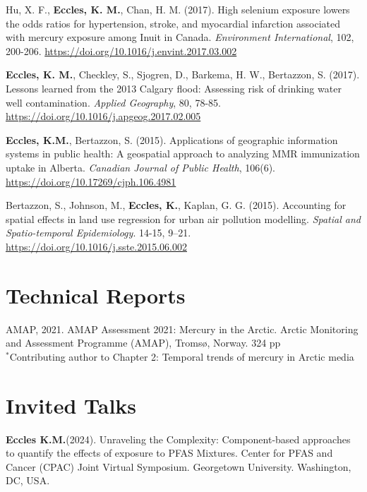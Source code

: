 \documentclass[margin,line]{res}
\begin{document}
\begin{resume}
Hu, X. F., \textbf{Eccles, K. M.}, Chan, H. M. (2017). High selenium exposure lowers the odds ratios for hypertension, stroke, and myocardial infarction associated with mercury exposure among Inuit in Canada. \textit{Environment International}, 102, 200-206. \url{https://doi.org/10.1016/j.envint.2017.03.002}

\textbf{Eccles, K. M.}, Checkley, S., Sjogren, D., Barkema, H. W., Bertazzon, S. (2017). Lessons learned from the 2013 Calgary flood: Assessing risk of drinking water well contamination. \textit{Applied Geography}, 80, 78-85. \url{https://doi.org/10.1016/j.apgeog.2017.02.005}

\textbf{Eccles, K.M.}, Bertazzon, S. (2015). Applications of geographic information systems in public health: A geospatial approach to analyzing MMR immunization uptake in Alberta. \textit{Canadian Journal of Public Health}, 106(6). \url{https://doi.org/10.17269/cjph.106.4981}

Bertazzon, S., Johnson, M., \textbf{Eccles, K.}, Kaplan, G. G. (2015). Accounting for spatial effects in land use regression for urban air pollution modelling. \textit{Spatial and Spatio-temporal Epidemiology}. 14-15, 9–21. \url{https://doi.org/10.1016/j.sste.2015.06.002}


\vspace*{.1in}
\section{\sc Technical Reports}
AMAP, 2021. AMAP Assessment 2021: Mercury in the Arctic. Arctic Monitoring and Assessment Programme (AMAP), Tromsø, Norway. 324 pp\\
$^{*}$Contributing author to Chapter 2: Temporal trends of mercury in Arctic media\\
\vspace*{.1in}
\section{\sc Invited Talks}

\begin{etaremune}[start=9]

\item \textbf{Eccles K.M.}(2024). Unraveling the Complexity: Component-based approaches to quantify the effects of exposure to PFAS Mixtures. Center for PFAS and Cancer (CPAC) Joint Virtual Symposium. Georgetown University. Washington, DC, USA.


\end{etaremune}
\end{resume}
\end{document}
